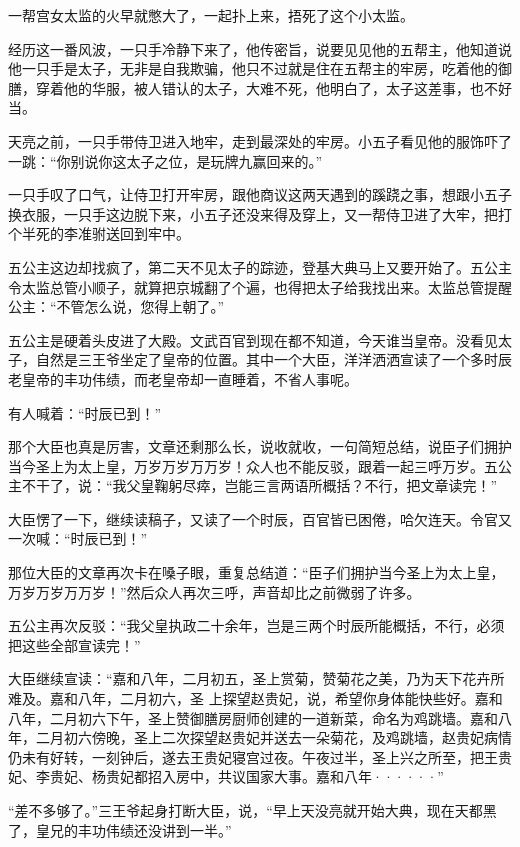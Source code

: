 一帮宫女太监的火早就憋大了，一起扑上来，捂死了这个小太监。

经历这一番风波，一只手冷静下来了，他传密旨，说要见见他的五帮主，他知道说他一只手是太子，无非是自我欺骗，他只不过就是住在五帮主的牢房，吃着他的御膳，穿着他的华服，被人错认的太子，大难不死，他明白了，太子这差事，也不好当。

天亮之前，一只手带侍卫进入地牢，走到最深处的牢房。小五子看见他的服饰吓了一跳：“你别说你这太子之位，是玩牌九赢回来的。”

一只手叹了口气，让侍卫打开牢房，跟他商议这两天遇到的蹊跷之事，想跟小五子换衣服，一只手这边脱下来，小五子还没来得及穿上，又一帮侍卫进了大牢，把打个半死的李准驸送回到牢中。
\newline

五公主这边却找疯了，第二天不见太子的踪迹，登基大典马上又要开始了。五公主令太监总管小顺子，就算把京城翻了个遍，也得把太子给我找出来。太监总管提醒公主：“不管怎么说，您得上朝了。”

五公主是硬着头皮进了大殿。文武百官到现在都不知道，今天谁当皇帝。没看见太子，自然是三王爷坐定了皇帝的位置。其中一个大臣，洋洋洒洒宣读了一个多时辰老皇帝的丰功伟绩，而老皇帝却一直睡着，不省人事呢。

有人喊着：“时辰已到！”

那个大臣也真是厉害，文章还剩那么长，说收就收，一句简短总结，说臣子们拥护当今圣上为太上皇，万岁万岁万万岁！众人也不能反驳，跟着一起三呼万岁。五公主不干了，说：“我父皇鞠躬尽瘁，岂能三言两语所概括？不行，把文章读完！”

大臣愣了一下，继续读稿子，又读了一个时辰，百官皆已困倦，哈欠连天。令官又一次喊：“时辰已到！”

那位大臣的文章再次卡在嗓子眼，重复总结道：“臣子们拥护当今圣上为太上皇，万岁万岁万万岁！”然后众人再次三呼，声音却比之前微弱了许多。

五公主再次反驳：“我父皇执政二十余年，岂是三两个时辰所能概括，不行，必须把这些全部宣读完！”

大臣继续宣读：“嘉和八年，二月初五，圣上赏菊，赞菊花之美，乃为天下花卉所难及。嘉和八年，二月初六，圣
上探望赵贵妃，说，希望你身体能快些好。嘉和八年，二月初六下午，圣上赞御膳房厨师创建的一道新菜，命名为鸡跳墙。嘉和八年，二月初六傍晚，圣上二次探望赵贵妃并送去一朵菊花，及鸡跳墙，赵贵妃病情仍未有好转，一刻钟后，遂去王贵妃寝宫过夜。午夜过半，圣上兴之所至，把王贵妃、李贵妃、杨贵妃都招入房中，共议国家大事。嘉和八年······”

“差不多够了。”三王爷起身打断大臣，说，“早上天没亮就开始大典，现在天都黑了，皇兄的丰功伟绩还没讲到一半。”

